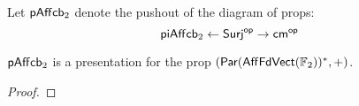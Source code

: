 \begin{definition}

Let $\mathsf{p}\mathsf{Aff}{\sf cb}_2$ denote the pushout of the diagram of props:
$$
\mathsf{p}\mathsf{i}\mathsf{Aff}{\sf cb}_2 \leftarrow {\sf Surj}^{\mathsf{op}} \rightarrow {\sf cm}^{\mathsf{op}}
$$

\end{definition}





\begin{lemma}
\label{lem:paraffcb}

$\mathsf{p}\mathsf{Aff}{\sf cb}_2$ is a presentation for the prop $(\mathsf{Par}(\mathsf{Aff}\mathsf{Fd}\mathsf{Vect}(\mathbb{F}_2))^*,+)$.
\end{lemma}

\begin{proof}
%




\end{proof}
